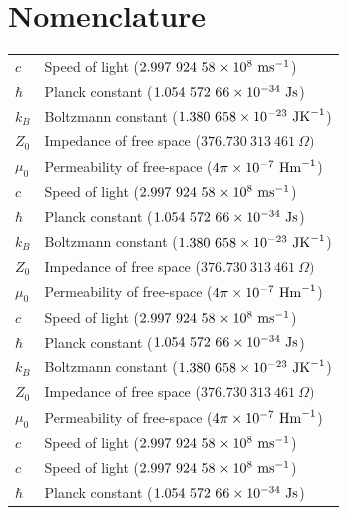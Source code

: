 \chapter*{Nomenclature}

\setlength\LTleft{-5pt} %

\begin{longtable}{l p{}}
    $c$     & Speed of light ($2.997\ 924\ 58 \times 10^{8}\ \mbox{ms}^{-1}$)    \\
    $\hbar$ & Planck constant ($1.054\ 572\ 66\times 10^{-34}\ \mbox{Js}$)       \\
    $k_B$   & Boltzmann constant  ($1.380\ 658\times 10^{-23}\ \mbox{JK}^{-1} $) \\
    $Z_0$   & Impedance of free space  ($376.730\ 313\ 461\ \Omega) $    \\
    $\mu_0$ & Permeability of free-space ($4\pi\times 10^{-7}\ \mbox{Hm}^{-1}$)  \\
    $c$     & Speed of light ($2.997\ 924\ 58 \times 10^{8}\ \mbox{ms}^{-1}$)    \\
    $\hbar$ & Planck constant ($1.054\ 572\ 66\times 10^{-34}\ \mbox{Js}$)       \\
    $k_B$   & Boltzmann constant  ($1.380\ 658\times 10^{-23}\ \mbox{JK}^{-1} $) \\
    $Z_0$   & Impedance of free space  ($376.730\ 313\ 461\ \Omega) $    \\
    $\mu_0$ & Permeability of free-space ($4\pi\times 10^{-7}\ \mbox{Hm}^{-1}$)  \\
    $c$     & Speed of light ($2.997\ 924\ 58 \times 10^{8}\ \mbox{ms}^{-1}$)    \\
    $\hbar$ & Planck constant ($1.054\ 572\ 66\times 10^{-34}\ \mbox{Js}$)       \\
    $k_B$   & Boltzmann constant  ($1.380\ 658\times 10^{-23}\ \mbox{JK}^{-1} $) \\
    $Z_0$   & Impedance of free space  ($376.730\ 313\ 461\ \Omega) $    \\
    $\mu_0$ & Permeability of free-space ($4\pi\times 10^{-7}\ \mbox{Hm}^{-1}$)  \\
    $c$     & Speed of light ($2.997\ 924\ 58 \times 10^{8}\ \mbox{ms}^{-1}$)    \\
    $c$     & Speed of light ($2.997\ 924\ 58 \times 10^{8}\ \mbox{ms}^{-1}$)    \\
    $\hbar$ & Planck constant ($1.054\ 572\ 66\times 10^{-34}\ \mbox{Js}$)       \\

\end{longtable}
